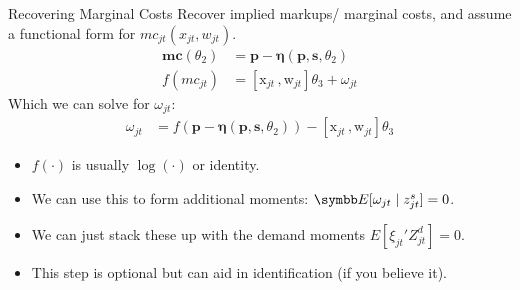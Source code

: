 \documentclass[aspectratio=169,10pt]{beamer}
\begin{document}
\begin{frame}{Recovering Marginal Costs }
Recover implied markups/ marginal costs, and assume a functional form for $mc_{jt}(x_{jt},w_{jt})$.
\begin{align*}
\symbf{mc}(\theta_2)&= \symbf{p}- \symbf{\eta}(\symbf{p},\symbf{s},\theta_2)\\
f(mc_{jt}) &= [\textrm{x}_{jt} \,, \textrm{w}_{jt}] \theta_3 + \omega_{jt}
\end{align*}
Which we can solve for $\omega_{jt}$:
\begin{align*}
\omega_{jt} &=  f(\symbf{p}- \symbf{\eta}(\symbf{p},\symbf{s},\theta_2) ) -[\textrm{x}_{jt} \,, \textrm{w}_{jt}] \theta_3 
\end{align*}
\begin{itemize}
\item $f(\cdot)$ is usually $\log(\cdot)$ or identity.
\item We can use this to form additional moments: $\E[\omega_{jt} \mid  z_{jt}^{s}]=0$.
\item We can just stack these up with the demand moments $E[\xi_{jt}' Z_{jt}^d]=0$.
\item This step is optional but can aid in identification (if you believe it).
\end{itemize}
\end{frame}


\end{document}
